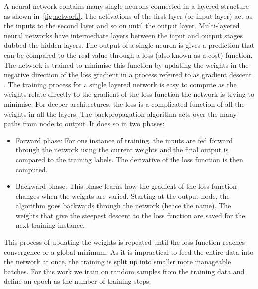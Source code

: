 \documentclass[12pt]{iopart}
\begin{document}
%
A neural network contains many single neurons connected in a layered structure
as shown in~\cref{fig:network}. The activations of the first layer (or
input layer) act as the inputs to the second layer and so on until the output
layer. Multi-layered neural networks have intermediate layers between the input
and output stages dubbed the hidden layers.
%
The output of a single neuron is gives a
prediction that can be compared to the real value through a loss (also known as a
cost) function. The network is trained to minimise this function by updating the weights in the negative
direction of the loss gradient in a process referred to as gradient
descent \cite{ruder2016overview}. The training process for a single layered network is easy to compute as the weights relate directly to the gradient of the loss function the network is trying to minimise. For deeper architectures, the loss is a complicated function of all the weights in all the layers. The backpropagation \cite{Nielsen1992} algorithm acts over the many paths from node to output. It does so in two phases:

\begin{itemize}
\item Forward phase: For one instance of training, the inputs are fed forward through the network using the current weights and the final output is compared to the training labels. The derivative of the loss function is then computed.
\item Backward phase: This phase learns how the gradient of the loss function changes when the weights are varied. Starting at the output node, the algorithm goes backwards through the network (hence the name). The weights that give the steepest descent to the loss function are saved for the next training instance.  
\end{itemize}
This process of updating the weights is repeated until the loss function reaches convergence or a global minimum. As it is impractical to feed the entire data into the network at once, the training is split up into smaller more manageable batches. For this work we train on random samples from the training data and define an epoch as the number of training steps.


\end{document}
